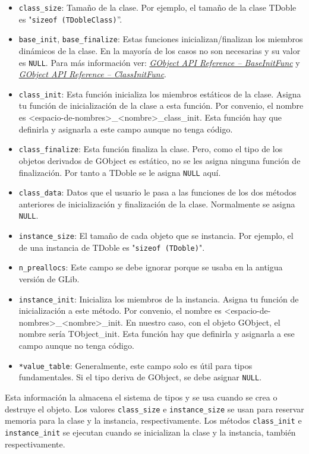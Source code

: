 \begin{itemize}
  \tightlist
\item \texttt{class\_size}: Tamaño de la clase. Por ejemplo, el tamaño de la clase
  \textsf{TDoble} es "\texttt{sizeof (TDobleClass)}''.
\item \texttt{base\_init}, \texttt{base\_finalize}: Estas funciones inicializan/finalizan
  los miembros dinámicos de la clase. En la mayoría de los casos no son necesarias y
  su valor es \texttt{NULL}.
  Para más información ver:
  \href{https://docs.gtk.org/gobject/callback.BaseInitFunc.html}
  {\textit{GObject API Reference -- BaseInitFunc}} y
  \href{https://docs.gtk.org/gobject/callback.ClassInitFunc.html}
  {\textit{GObject API Reference -- ClassInitFunc}}.
\item \texttt{class\_init}: Esta función inicializa los miembros estáticos de la clase. Asigna tu función de
  inicialización de la clase a esta función.
  Por convenio, el nombre es \textsf{<espacio-de-nombres>\_<nombre>\_class\_init}.
  Esta función hay que definirla y asignarla a este campo aunque no tenga código.
\item \texttt{class\_finalize}: Esta función finaliza la clase. Pero, como el tipo de los objetos derivados de
  \textsf{GObject} es estático, no se les asigna ninguna función de finalización. Por tanto a \textsf{TDoble}
  se le asigna \texttt{NULL} aquí.
\item \texttt{class\_data}: Datos que el usuario le pasa a las funciones de los dos métodos anteriores
  de inicialización y finalización de la clase. Normalmente se asigna \texttt{NULL}.
\item \texttt{instance\_size}: El tamaño de cada objeto que se instancia. Por ejemplo, el de una instancia
  de \textsf{TDoble} es "\texttt{sizeof (TDoble)}".
\item \texttt{n\_preallocs}: Este campo se debe ignorar porque se usaba en la antigua versión de \textsf{GLib}.
\item \texttt{instance\_init}: Inicializa los miembros de la instancia. Asigna tu función de inicialización a este
  método. Por convenio, el nombre es \textsf{<espacio-de-nombres>\_<nombre>\_init}. En nuestro caso, con
  el objeto \textsf{GObject}, el nombre sería \textsf{TObject\_init}.
  Esta función hay que definirla y asignarla a ese campo aunque no tenga código.
\item \texttt{*value\_table}:  Generalmente, este campo solo es útil para tipos fundamentales. Si el tipo deriva
  de \textsf{GObject}, se debe asignar \texttt{NULL}.
\end{itemize}
Esta información la almacena el sistema de tipos y se usa cuando se crea o destruye el objeto.
Los valores \texttt{class\_size} e \texttt{instance\_size} se usan para reservar memoria para la clase y la instancia,
respectivamente. Los métodos \texttt{class\_init} e \texttt{instance\_init} se ejecutan cuando se inicializan
la clase y la instancia, también respectivamente.

